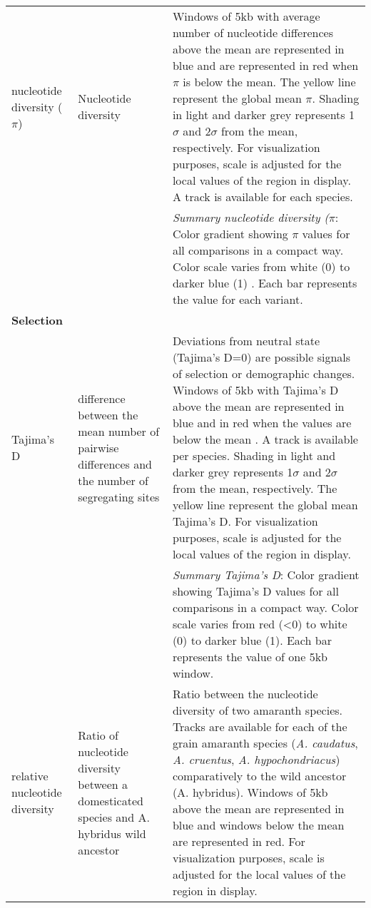 \documentclass[9pt,twocolumn,twoside]{celabRxiv}
\begin{document}
\begin{longtable}{p{2cm}p{5cm}p{9cm}}
nucleotide diversity ($\pi$) & Nucleotide diversity \citet{nei1979mathematical} & Windows of 5kb with average number of nucleotide differences above the mean are represented in blue and are represented in red when $\pi$ is below the mean. The yellow line represent the global mean $\pi$. Shading in light and darker grey represents 1$\sigma$ and 2$\sigma$ from the mean, respectively. For visualization purposes, scale is adjusted for the local values of the region in display. A track is available for each species.\\
& & 	\textit{Summary nucleotide diversity ($\pi$}: Color gradient showing $\pi$ values for all comparisons in a compact way. Color scale varies from white (0) to darker blue (1) . Each bar represents the value for each variant.\\

\textbf{Selection} & & \\ 
\hline
Tajima's D & difference between the mean number of pairwise differences and the number of segregating sites \cite{tajima1989statistical} & Deviations from neutral state (Tajima's D=0) are possible signals of selection or demographic changes.  
Windows of 5kb with Tajima's D above the mean are represented in blue and in red when the values are below the mean . A track is available per species. Shading in light and darker grey represents 1$\sigma$ and 2$\sigma$ from the mean, respectively. The yellow line represent the global mean Tajima's D. For visualization purposes, scale is adjusted for the local values of the region in display.\\
& & 	\textit{Summary Tajima's D}: Color gradient showing Tajima's D values for all comparisons in a compact way. Color scale varies from red (<0) to white (0) to darker blue (1). Each bar represents the value of one 5kb window. \\
relative nucleotide diversity & Ratio of nucleotide diversity between a domesticated species and A. hybridus wild ancestor & Ratio between the nucleotide diversity of two amaranth species.  Tracks are available for each of the grain amaranth species (\textit{A. caudatus}, \textit{A. cruentus}, \textit{A. hypochondriacus}) comparatively to the wild ancestor (A. hybridus). Windows of 5kb above the mean are represented in blue and windows below the mean are represented in red.  For visualization purposes, scale is adjusted for the local values of the region in display. \\


\end{longtable}
\end{document}
